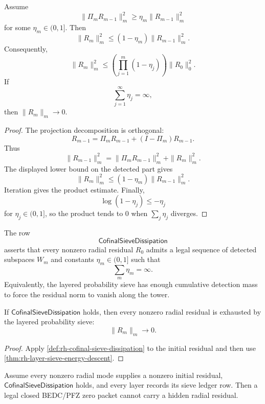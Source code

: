 \begin{theorem}
\label{thm:rh-layer-sieve-energy-descent}
Assume
$$
\|\Pi_m R_{m-1}\|_m^2
\ge
\eta_m\|R_{m-1}\|_m^2
$$
for some $\eta_m\in(0,1]$.  Then
$$
\|R_m\|_m^2
\le
(1-\eta_m)\|R_{m-1}\|_m^2.
$$
Consequently,
$$
\|R_m\|_m^2
\le
\left(\prod_{j=1}^{m}(1-\eta_j)\right)\|R_0\|_0^2.
$$
If
$$
\sum_{j=1}^{\infty}\eta_j=\infty,
$$
then $\|R_m\|_m\to0$.
\end{theorem}

\begin{proof}
The projection decomposition is orthogonal:
$$
R_{m-1}
=
\Pi_mR_{m-1}
+
(I-\Pi_m)R_{m-1}.
$$
Thus
$$
\|R_{m-1}\|_m^2
=
\|\Pi_mR_{m-1}\|_m^2+\|R_m\|_m^2.
$$
The displayed lower bound on the detected part gives
$$
\|R_m\|_m^2
\le
(1-\eta_m)\|R_{m-1}\|_m^2.
$$
Iteration gives the product estimate.  Finally,
$$
\log(1-\eta_j)\le-\eta_j
$$
for $\eta_j\in(0,1]$, so the product tends to $0$ when
$\sum_j\eta_j$ diverges.
\end{proof}

\begin{definition}[CofinalSieveDissipation]
\label{def:rh-cofinal-sieve-dissipation}
The row
$$
\mathsf{CofinalSieveDissipation}
$$
asserts that every nonzero radial residual $R_0$ admits a legal
sequence of detected subspaces $W_m$ and constants $\eta_m\in(0,1]$
such that
$$
\sum_m\eta_m=\infty.
$$
Equivalently, the layered probability sieve has enough cumulative
detection mass to force the residual norm to vanish along the tower.
\end{definition}

\begin{theorem}
\label{thm:rh-cofinal-sieve-dissipates-radial-residuals}
If $\mathsf{CofinalSieveDissipation}$ holds, then every nonzero radial
residual is exhausted by the layered probability sieve:
$$
\|R_m\|_m\to0.
$$
\end{theorem}

\begin{proof}
Apply \autoref{def:rh-cofinal-sieve-dissipation} to the initial
residual and then use \autoref{thm:rh-layer-sieve-energy-descent}.
\end{proof}

\begin{theorem}
\label{thm:rh-cofinal-probability-sieve-excludes-hidden-radial-residuals}
Assume every nonzero radial mode supplies a nonzero initial residual,
$\mathsf{CofinalSieveDissipation}$ holds, and every layer records its
sieve ledger row.  Then a legal closed BEDC/PFZ zero packet cannot
carry a hidden radial residual.
\end{theorem}

